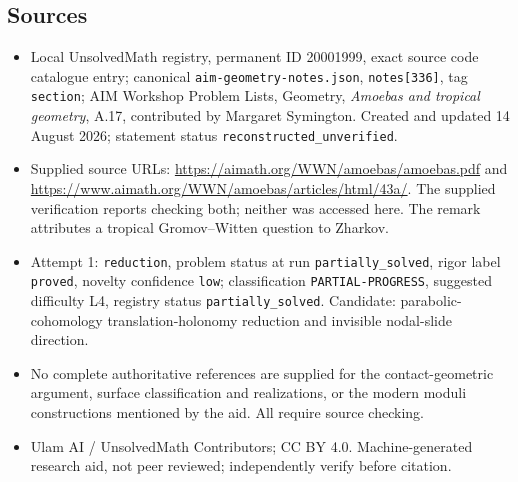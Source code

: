 \documentclass[11pt]{article}
\begin{document}
\subsection{Sources}
\begin{itemize}
\item Local UnsolvedMath registry, permanent ID 20001999, exact source code catalogue entry; canonical \texttt{aim-geometry-notes.json}, \texttt{notes[336]}, tag \texttt{section}; AIM Workshop Problem Lists, Geometry, \emph{Amoebas and tropical geometry}, A.17, contributed by Margaret Symington. Created and updated 14 August 2026; statement status \texttt{reconstructed\_unverified}.
\item Supplied source URLs: \url{https://aimath.org/WWN/amoebas/amoebas.pdf} and \url{https://www.aimath.org/WWN/amoebas/articles/html/43a/}. The supplied verification reports checking both; neither was accessed here. The remark attributes a tropical Gromov--Witten question to Zharkov.
\item Attempt 1: \texttt{reduction}, problem status at run \texttt{partially\_solved}, rigor label \texttt{proved}, novelty confidence \texttt{low}; classification \texttt{PARTIAL-PROGRESS}, suggested difficulty L4, registry status \texttt{partially\_solved}. Candidate: parabolic-cohomology translation-holonomy reduction and invisible nodal-slide direction.
\item No complete authoritative references are supplied for the contact-geometric argument, surface classification and realizations, or the modern moduli constructions mentioned by the aid. All require source checking.
\item Ulam AI / UnsolvedMath Contributors; CC BY 4.0. Machine-generated research aid, not peer reviewed; independently verify before citation.
\end{itemize}
\end{document}
